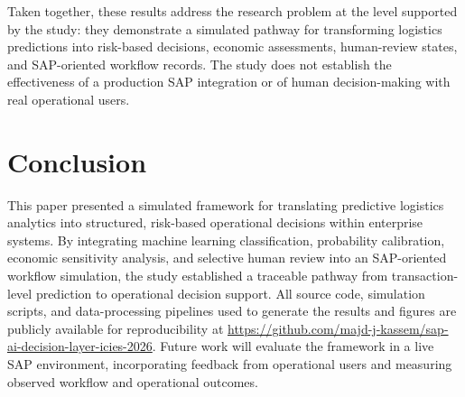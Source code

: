 \documentclass[10pt,a4paper]{article}
\begin{document}
Taken together, these results address the research problem at the level
supported by the study: they demonstrate a simulated pathway for
transforming logistics predictions into risk-based decisions, economic
assessments, human-review states, and SAP-oriented workflow records.
The study does not establish the effectiveness of a production SAP
integration or of human decision-making with real operational users.
\section{Conclusion}

This paper presented a simulated framework for translating predictive logistics analytics into structured, risk-based operational decisions within enterprise systems. By integrating machine learning classification, probability calibration, economic sensitivity analysis, and selective human review into an SAP-oriented workflow simulation, the study established a traceable pathway from transaction-level prediction to operational decision support. All source code, simulation scripts, and data-processing pipelines used to generate the results and figures are publicly available for reproducibility at \url{https://github.com/majd-j-kassem/sap-ai-decision-layer-icies-2026}. Future work will evaluate the framework in a live SAP environment, incorporating feedback from operational users and measuring observed workflow and operational outcomes.


\end{document}
